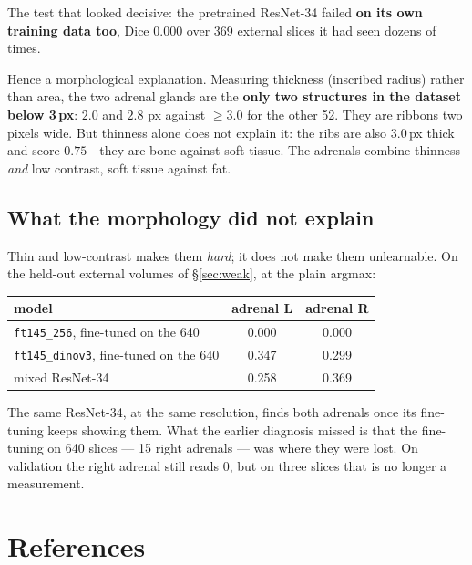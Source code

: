 \documentclass{article}
\begin{document}
\vspace{2.0mm}

\noindent The test that looked decisive: the pretrained ResNet-34 failed \textbf{on its
own training data too}, Dice $0.000$ over 369 external slices it had seen dozens
of times.

\vspace{2.0mm}

\noindent Hence a morphological explanation. Measuring thickness (inscribed radius) rather than
area, the two adrenal glands are the \textbf{only two structures in the dataset
below 3\,px}: $2.0$ and $2.8$ px against $\geq 3.0$ for the other 52. They are
ribbons two pixels wide. But thinness alone does not explain it: the ribs are
also $3.0$\,px thick and score $0.75$ - they are bone against soft tissue. The
adrenals combine thinness \emph{and} low contrast, soft tissue against fat.

\subsection{What the morphology did not explain}

Thin and low-contrast makes them \emph{hard}; it does not make them unlearnable.
On the held-out external volumes of \S\ref{sec:weak}, at the plain argmax:

\begin{center}
\begin{tabular}{lcc}
\hline
\textbf{model} & \textbf{adrenal L} & \textbf{adrenal R} \\
\hline
\texttt{ft145\_256}, fine-tuned on the 640 & 0.000 & 0.000 \\
\texttt{ft145\_dinov3}, fine-tuned on the 640 & 0.347 & 0.299 \\
mixed ResNet-34 & 0.258 & 0.369 \\
\hline
\end{tabular}
\end{center}

\noindent The same ResNet-34, at the same resolution, finds both adrenals once its
fine-tuning keeps showing them. What the earlier diagnosis missed is that the
fine-tuning on 640 slices --- 15 right adrenals --- was where they were lost. On
validation the right adrenal still reads 0, but on three slices that is no longer
a measurement.


\newpage

\section*{References}
\end{document}

